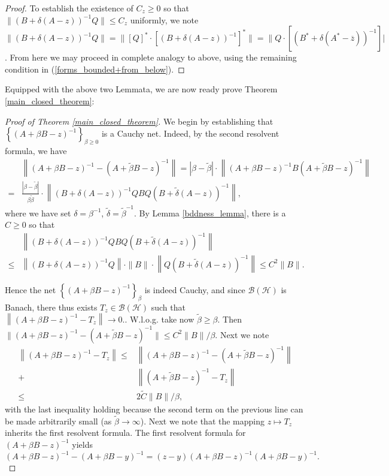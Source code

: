 \documentclass[reqno,12pt,letterpaper]{amsart}
\numberwithin{equation}{section}
\newcommand{\1}{\mathds{1}}
\theoremstyle{definition}
\begin{document}
\begin{proof}
	To establish the existence of $C_z \geq 0$ so that  $\|(B + \delta (A-z))^{-1}Q\| \leq C_z$ uniformly, we note  $\|(B + \delta (A-z))^{-1}Q\| = \|[Q]^* \cdot [(B + \delta (A-z))^{-1}]^*\| = \|Q\cdot [(B^* + \delta (A^*-\overline{z}))^{-1}]| $.
	From here we may proceed in complete analogy to above, using the remaining condition in (\ref{forms_bounded+from_below}).
	
\end{proof}







Equipped with the above two Lemmata, we are now ready prove Theorem  \ref{main_closed_theorem}:
\begin{proof}[Proof of Theorem \ref{main_closed_theorem}]
	We begin by establishing that \(\left\{ (A + \beta B - z)^{-1} \right\}_{\beta \geq 0}\) is a Cauchy net. Indeed, by the second resolvent formula, we have
	\begin{align}
		&\left\| (A + \beta B - z)^{-1} - (A + \tilde{\beta} B - z)^{-1} \right\| = |\beta - \tilde{\beta}| \cdot \left\| (A + \beta B - z)^{-1} B (A + \tilde{\beta} B - z)^{-1} \right\|\\
		=& \frac{|\beta - \tilde{\beta}|}{\beta \tilde{\beta}} \cdot \left\| (B + \delta (A - z))^{-1} Q B Q (B + \tilde{\delta} (A - z))^{-1} \right\|,
	\end{align}
	where we have set \(\delta = \beta^{-1}\), \(\tilde{\delta} = \tilde{\beta}^{-1}\). By Lemma \ref{bddness_lemma}, there is a $C \geq 0$ so that  
	\begin{align}
		&\left\| (B + \delta (A - z))^{-1} Q B Q (B + \tilde{\delta} (A - z))^{-1} \right\|\\
		\leq &\left\| (B + \delta (A - z))^{-1} Q \right\| \cdot \|B\| \cdot \left\| Q (B + \tilde{\delta} (A - z))^{-1} \right\| \leq C^2 \|B\|.
	\end{align}
	
	Hence the net \(\left\{ (A + \beta B - z)^{-1}\right\}_\beta\) is indeed Cauchy, and
	since \(\mathcal{B}(\mathcal{H})\) is Banach, there thus exists \(T_z \in \mathcal{B}(\mathcal{H})\) such that
	$
	\left\| (A + \beta B - z)^{-1} - T_z \right\| \to 0.
	$.
	W.l.o.g. take now \(\tilde{\beta} \geq \beta\). Then
	$
	\| (A + \beta B - z)^{-1} - (A + \tilde{\beta} B - z)^{-1} \| \leq C^2 \|B\|/\beta.
	$
	Next we note
	\begin{align}
		\left\| (A + \beta B - z)^{-1} - T_z \right\| 
		\leq& \left\| (A + \beta B - z)^{-1} - (A + \tilde{\beta} B - z)^{-1} \right\| \\
		+& \left\| (A + \tilde{\beta} B - z)^{-1} - T_z \right\|\\
		\leq& 2 \tilde{C} \|B\|/\beta,
	\end{align}
	with the last inequality holding because the second term on the previous line can be made arbitrarily small (as \(\tilde{\beta} \to \infty\)).
	Next we note that the mapping \(z \mapsto T_z\) inherits the first resolvent formula. The first resolvent formula for \((A + \beta B - z)^{-1}\) yields
	\[
	(A + \beta B - z)^{-1} - (A + \beta B - y)^{-1} = (z - y) (A + \beta B - z)^{-1} (A + \beta B - y)^{-1}.
	\]
	

\end{proof}
\end{document}
